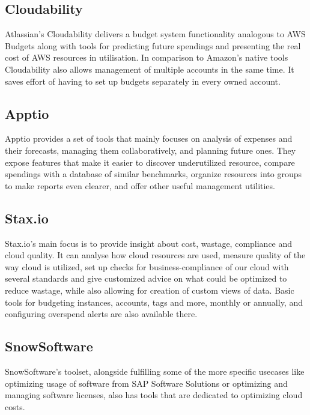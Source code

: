 \documentclass[licencjacka,en]{thesisclass}
\begin{document}
    \subsection{Cloudability}

    Atlassian's Cloudability\cite{Cloudability} delivers a budget system functionality analogous to AWS Budgets
    along with tools for predicting future spendings and presenting the real cost of AWS resources in utilisation.
    In comparison to Amazon's native tools Cloudability also allows management of multiple accounts in the same time.
    It saves effort of having to set up budgets separately in every owned account.

    \subsection{Apptio}

    Apptio\cite{Apptio} provides a set of tools that mainly focuses on analysis of expenses and their forecasts,
    managing them collaboratively, and planning future ones.
    They expose features that make it easier to discover underutilized resource,
    compare spendings with a database of similar benchmarks,
    organize resources into groups to make reports even clearer,
    and offer other useful management utilities.

    \subsection{Stax.io}

    Stax.io's\cite{Stax.io} main focus is to provide insight about cost, wastage, compliance and cloud quality.
    It can analyse how cloud resources are used, measure quality of the way cloud is utilized,
    set up checks for business-compliance of our cloud with several standards
    and give customized advice on what could be optimized to reduce wastage,
    while also allowing for creation of custom views of data.
    Basic tools for budgeting instances, accounts, tags and more, monthly or annually,
    and configuring overspend alerts are also available there.

    \subsection{SnowSoftware}

    SnowSoftware's toolset, alongside fulfilling some of the more specific usecases
    like optimizing usage of software from SAP Software Solutions or optimizing and managing software licenses,
    also has tools that are dedicated to optimizing cloud costs.
\end{document}
